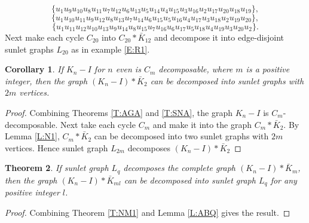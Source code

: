 \documentclass[12pt]{report}
\newtheorem{thm}{Theorem}[section]
\newtheorem{cor}[thm]{Corollary}
\begin{document}
$$\{u_1u_9u_{10}u_8u_{11}u_{7}u_{12}u_{6}u_{13}u_{5}u_{14}u_{4}u_{15}u_{3}u_{16}u_{2}u_{17}u_{20}u_{18}u_{19}\},$$
$$\{u_1u_{10}u_{11}u_9u_{12}u_{8}u_{13}u_{7}u_{14}u_{6}u_{15}u_{5}u_{16}u_{4}u_{17}u_{3}u_{18}u_{2}u_{19}u_{20}\},$$
$$\{u_1u_{11}u_{12}u_{10}u_{13}u_{9}u_{14}u_{8}u_{15}u_{7}u_{16}u_{6}u_{17}u_{5}u_{18}u_{4}u_{19}u_{3}u_{20}u_{2}\}.$$
Next make each cycle $C_{20}$ into $C_{20}*\bar{K}_{12}$ and
decompose it into edge-disjoint sunlet graphs $L_{20}$ as in example
\ref{E:R1}.
\begin{cor}
If $K_n-I$ for $n$  even is $C_m$ decomposable, where $m$
is a positive integer, then the graph $(K_n-I)*\bar{K}_{2}$ can be decomposed into sunlet graphs with $2m$ vertices.
\end{cor}
\begin{proof}
Combining Theorems \ref{T:AGA} and \ref{T:SNA}, the graph $K_n-I$ is $C_m$-decomposable.
Next take each cycle $C_m$  and make it into the graph
$C_m*\bar{K}_{2}$. By Lemma \ref{L:N1}, $C_m*\bar{K}_{2}$ can be
decomposed into two sunlet graphs with $2m$ vertices. Hence sunlet
graph $L_{2m}$ decomposes $(K_n-I)*\bar{K}_{2}$
\end{proof}
\begin{thm}
If sunlet graph $L_q$ decomposes the complete graph
$(K_n-I)*\bar{K}_{m}$, then the graph
$ (K_n-I)*\bar{K}_{ml}$ can be decomposed into
sunlet graph $L_q$ for any positive integer $l$.
\end{thm}
\begin{proof}
Combining Theorem \ref{T:NM1} and Lemma \ref{L:ABQ}
gives the result.
\end{proof}
\end{document}
